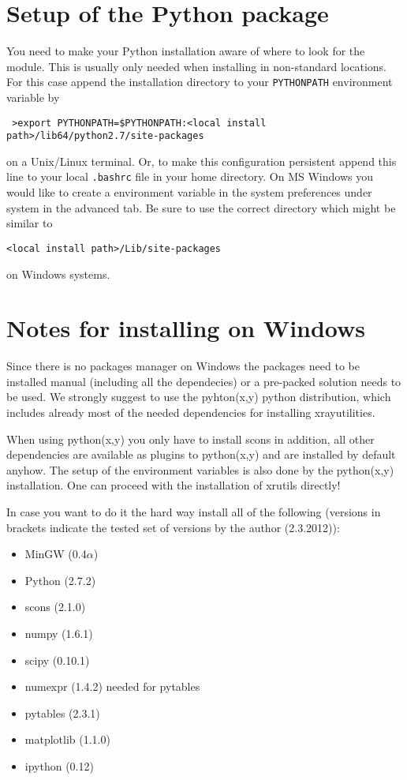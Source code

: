 \section{Setup of the Python package}

You need to make your Python installation aware of where to look for the module.
This is usually only needed when installing in non-standard {\tt<install path>} locations.
For this case append the installation directory to your {\tt PYTHONPATH} environment variable by 
\begin{verbatim}
 >export PYTHONPATH=$PYTHONPATH:<local install path>/lib64/python2.7/site-packages
\end{verbatim}
on a Unix/Linux terminal. Or, to make this configuration persistent append this line to
your local {\tt .bashrc} file in your home directory. 
On MS Windows you would like to create a environment variable in the 
system preferences under system in the advanced tab.
Be sure to use the correct directory which might be similar to 
\begin{verbatim}
<local install path>/Lib/site-packages
\end{verbatim}
on Windows systems.

\section{Notes for installing on Windows}

Since there is no packages manager on Windows the packages need to be installed manual 
(including all the dependecies) or a pre-packed solution needs to be used. We strongly suggest to
use the pyhton(x,y) python distribution, which includes already most of the needed dependencies for installing
xrayutilities.

When using python(x,y) you only have to install scons in addition, all other dependencies are available as plugins to python(x,y) 
and are installed by default anyhow. The setup of the environment variables is also done by the python(x,y) installation.
One can proceed with the installation of xrutils directly!

In case you want to do it the hard way install all of the following (versions in brackets indicate the tested set of 
versions by the author (2.3.2012)):

\begin{itemize}
\item MinGW (0.4$\alpha$)
\item Python (2.7.2)
\item scons (2.1.0)
\item numpy (1.6.1)
\item scipy (0.10.1)
\item numexpr (1.4.2) needed for pytables
\item pytables (2.3.1)
\item matplotlib (1.1.0)
\item ipython (0.12)
\end{itemize}

